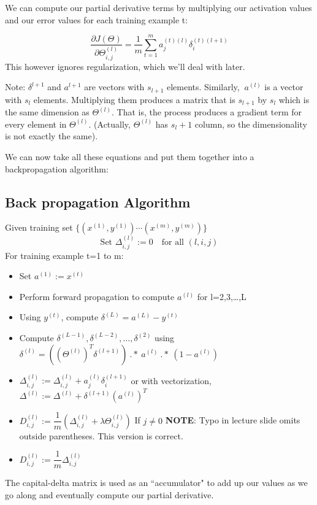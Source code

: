 We can compute our partial derivative terms by multiplying our activation values and our error values for each training example t:

$$\dfrac{\partial J(\Theta)}{\partial \Theta_{i,j}^{(l)}} = \frac{1}{m}\sum_{t=1}^m a_j^{(t)(l)} {\delta}_i^{(t)(l+1)} $$
This however ignores regularization, which we'll deal with later.

Note: $\delta^{l+1}$ and $a^{l+1}$ are vectors with $s_{l+1}$ elements. Similarly, $\ a^{(l)}$ is a vector with $s_l$ elements. Multiplying them produces a matrix that is $s_{l+1}$ by $s_l$ which is the same dimension as $\Theta^{(l)}$. That is, the process produces a gradient term for every element in $\Theta^{(l)}$. (Actually, $\Theta^{(l)}$ has $s_{l} + 1$ column, so the dimensionality is not exactly the same).

We can now take all these equations and put them together into a backpropagation algorithm:

\subsection{Back propagation Algorithm}
Given training set $\lbrace (x^{(1)}, y^{(1)}) \cdots (x^{(m)}, y^{(m)})\rbrace$
$$\text{Set } \Delta^{(l)}_{i,j} := 0\quad \text{for all } (l,i,j) $$
For training example t=1 to m:
\begin{itemize}
	\item Set $a^{(1)} := x^{(t)}$
	\item Perform forward propagation to compute $a^{(l)}$ for l=2,3,…,L
	\item Using $y^{(t)}$, compute $\delta^{(L)} = a^{(L)} - y^{(t)}$
	\item Compute $\delta^{(L-1)}, \delta^{(L-2)},\dots,\delta^{(2)}$ using $\delta^{(l)} = ((\Theta^{(l)})^T \delta^{(l+1)})\ .*\ a^{(l)}\ .*\ (1 - a^{(l)})$
	\item $\Delta^{(l)}_{i,j} := \Delta^{(l)}_{i,j} + a_j^{(l)} \delta_i^{(l+1)}$ or with vectorization,$ \Delta^{(l)} := \Delta^{(l)} + \delta^{(l+1)}(a^{(l)})^T$
	\item $ D^{(l)}_{i,j} := \dfrac{1}{m}\left(\Delta^{(l)}_{i,j} + \lambda\Theta^{(l)}_{i,j}\right)$ If $j \neq 0$ \textbf{NOTE}: Typo in lecture slide omits outside parentheses. This version is correct.
	\item $ D^{(l)}_{i,j} := \dfrac{1}{m}\Delta^{(l)}_{i,j}$
\end{itemize}
The capital-delta matrix is used as an ``accumulator" to add up our values as we go along and eventually compute our partial derivative.

